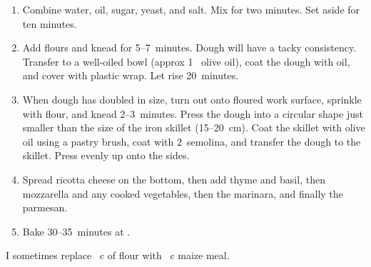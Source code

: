 
\begin{ingredients}


\end{ingredients}


\begin{recipe}
  \begin{enumerate}

  \item Combine water, oil, sugar, yeast, and salt.  Mix for two
    minutes.  Set aside for ten minutes.

  \item Add flours and knead for 5--7~minutes.  Dough will have a
    tacky consistency.  Transfer to a well-oiled bowl (approx 1~\tbsp
    olive oil), coat the dough with oil, and cover with plastic wrap.
    Let rise 20~minutes.

  \item When dough has doubled in size, turn out onto floured work
    surface, sprinkle with flour, and knead 2--3~minutes.  Press the
    dough into a circular shape just smaller than the size of the iron
    skillet (15--20~cm).  Coat the skillet with olive oil using a
    pastry brush, coat with 2~\tbsp semolina, and transfer the dough
    to the skillet.  Press evenly up onto the sides.

  \item Spread ricotta cheese on the bottom, then add thyme and basil,
    then mozzarella and any cooked vegetables, then the marinara, and
    finally the parmesan.

  \item Bake 30--35~minutes at .

  \end{enumerate}
\end{recipe}

I sometimes replace \fracH~c of flour with \fracQQ~c maize meal.

